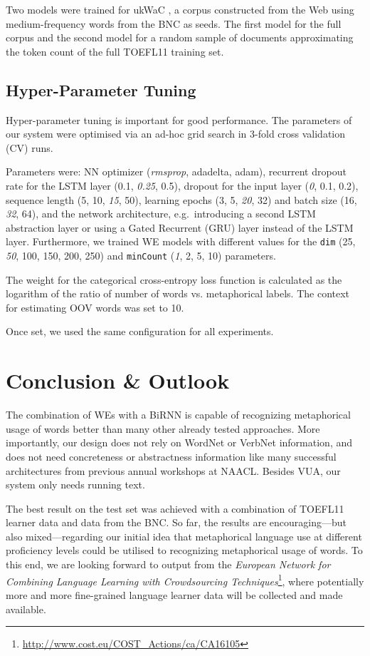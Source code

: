 \documentclass[11pt,a4paper]{article}
\begin{document}
Two models were trained for ukWaC \cite{wackycorpora2009}, a corpus constructed from the Web using medium-frequency words from the BNC as seeds.
The first model for the full corpus and the second model for a random sample of documents approximating the token count of the full TOEFL11 training set.



\subsection{Hyper-Parameter Tuning} %
Hyper-parameter tuning is important for good performance. The parameters of our system were optimised via an ad-hoc grid search in 3-fold cross validation (CV) runs.

Parameters were:
NN optimizer (\emph{rmsprop}, adadelta, adam), recurrent dropout rate for the LSTM layer (0.1, \emph{0.25}, 0.5), dropout for the input layer (\emph{0}, 0.1, 0.2), sequence length (5, 10, \emph{15}, 50), learning epochs (3, 5, \emph{20}, 32) and batch size (16, \emph{32}, 64), and the network architecture, e.g.~introducing a second LSTM abstraction layer or using a Gated Recurrent (GRU) layer instead of the LSTM layer.
Furthermore, we trained WE models with different values for the \texttt{dim} (25, \emph{50}, 100, 150, 200, 250) and \texttt{minCount} (\emph{1}, 2, 5, 10) parameters.

The weight for the categorical cross-entropy loss function is calculated as the logarithm of the ratio of number of words vs. metaphorical labels. The context for estimating OOV words was set to 10.

Once set, we used the same configuration for all experiments.


\section{Conclusion \& Outlook} %
\label{sec:conclusion}

The combination of WEs with a BiRNN is capable of recognizing metaphorical usage of words better than many other already tested approaches.
More importantly, our design does not rely on WordNet or VerbNet information, and does not need concreteness or abstractness information like many successful architectures from previous annual workshops at NAACL. 
Besides VUA, our system only needs running text.

The best result on the test set was achieved with a combination of TOEFL11 learner data and data from the BNC. 
So far, the results are encouraging---but also mixed---regarding our initial idea that metaphorical language use at different proficiency levels could be utilised to recognizing metaphorical usage of words. 
To this end, we are looking forward to output from the \emph{European Network for Combining Language Learning with Crowdsourcing Techniques}\footnote{\url{http://www.cost.eu/COST_Actions/ca/CA16105}}, where potentially more and more fine-grained language learner data will be collected and made available.
\end{document}
